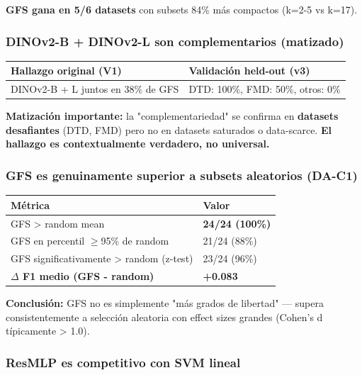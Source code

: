\textbf{GFS gana en 5/6 datasets} con subsets 84\% más compactos (k=2-5 vs k=17).

\subsubsection{DINOv2-B + DINOv2-L son complementarios (matizado)}

\begin{table}[h]
\centering
\begin{tabular}{ll}
\toprule
Hallazgo original (V1) & Validación held-out (v3) \\
\midrule
DINOv2-B + L juntos en 38\% de GFS & DTD: 100\%, FMD: 50\%, otros: 0\% \\
\bottomrule
\end{tabular}
\end{table}

\textbf{Matización importante:} la "complementariedad" se confirma en \textbf{datasets desafiantes} (DTD, FMD) pero no en datasets saturados o data-scarce. \textbf{El hallazgo es contextualmente verdadero, no universal.}

\subsubsection{GFS es genuinamente superior a subsets aleatorios (DA-C1)}

\begin{table}[h]
\centering
\begin{tabular}{ll}
\toprule
Métrica & Valor \\
\midrule
GFS > random mean & \textbf{24/24 (100\%)} \\
GFS en percentil $\geq$95\% de random & 21/24 (88\%) \\
GFS significativamente > random (z-test) & 23/24 (96\%) \\
\textbf{$\Delta$ F1 medio (GFS - random)} & \textbf{+0.083} \\
\bottomrule
\end{tabular}
\end{table}

\textbf{Conclusión:} GFS no es simplemente "más grados de libertad" --- supera consistentemente a selección aleatoria con effect sizes grandes (Cohen's d típicamente > 1.0).

\subsubsection{ResMLP es competitivo con SVM lineal}

